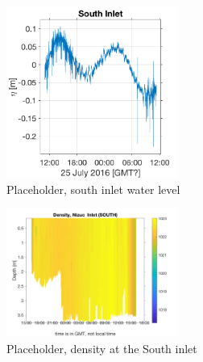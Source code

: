 \documentclass[11pt]{article}
\begin{document}
\begin{figure}[ht!]
\centerline{\includegraphics[width=0.5\textwidth]{images/waterlevel_southinlet.png}}
\internallinenumbers\caption{Placeholder, south inlet water level}
\label{figWLnizuc}
\end{figure}

\begin{figure}[ht!]
\centerline{\includegraphics[width=0.5\textwidth]{images/density_nizuc_nichupte_southinlet.png}}
\internallinenumbers\caption{Placeholder, density at the South inlet}
\label{figDensityNizuc}
\end{figure}
\end{document}
